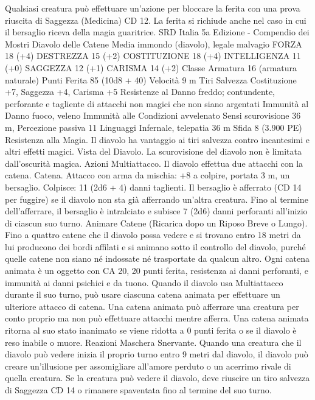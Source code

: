 \begin{multicols}{2}
Qualsiasi creatura può effettuare un’azione per bloccare la ferita
con una prova riuscita di Saggezza (Medicina) CD 12. La ferita
si richiude anche nel caso in cui il bersaglio riceva della magia
guaritrice. 
SRD Italia 5a Edizione - Compendio dei Mostri
Diavolo delle Catene
Media immondo (diavolo), legale malvagio
FORZA 18 (+4)
DESTREZZA 15 (+2)
COSTITUZIONE 18 (+4)
INTELLIGENZA 11 (+0)
SAGGEZZA 12 (+1)
CARISMA 14 (+2)
Classe Armatura 16 (armatura naturale)
Punti Ferita 85 (10d8 + 40)
Velocità 9 m
Tiri Salvezza Costituzione +7, Saggezza +4, Carisma +5
Resistenze al Danno freddo; contundente, perforante e tagliente
di attacchi non magici che non siano argentati
Immunità al Danno fuoco, veleno
Immunità alle Condizioni avvelenato
Sensi scurovisione 36 m, Percezione passiva 11
Linguaggi Infernale, telepatia 36 m
Sfida 8 (3.900 PE)
Resistenza alla Magia. Il diavolo ha vantaggio ai tiri salvezza
contro incantesimi e altri effetti magici.
Vista del Diavolo. La scurovisione del diavolo non è limitata
dall’oscurità magica.
Azioni
Multiattacco. Il diavolo effettua due attacchi con la catena.
Catena. Attacco con arma da mischia: +8 a colpire, portata 3 m,
un bersaglio.
Colpisce: 11 (2d6 + 4) danni taglienti. Il bersaglio è afferrato
(CD 14 per fuggire) se il diavolo non sta già afferrando un’altra
creatura. Fino al termine dell’afferrare, il bersaglio è intralciato e
subisce 7 (2d6) danni perforanti all’inizio di ciascun suo turno.
Animare Catene (Ricarica dopo un Riposo Breve o Lungo).
Fino a quattro catene che il diavolo possa vedere e si trovano
entro 18 metri da lui producono dei bordi affilati e si animano
sotto il controllo del diavolo, purché quelle catene non siano né
indossate né trasportate da qualcun altro.
Ogni catena animata è un oggetto con CA 20, 20 punti ferita,
resistenza ai danni perforanti, e immunità ai danni psichici e da
tuono. Quando il diavolo usa Multiattacco durante il suo turno,
può usare ciascuna catena animata per effettuare un ulteriore
attacco di catena. Una catena animata può afferrare una creatura
per conto proprio ma non può effettuare attacchi mentre afferra.
Una catena animata ritorna al suo stato inanimato se viene ridotta
a 0 punti ferita o se il diavolo è reso inabile o muore.
Reazioni
Maschera Snervante. Quando una creatura che il diavolo può
vedere inizia il proprio turno entro 9 metri dal diavolo, il diavolo
può creare un’illusione per assomigliare all’amore perduto o un
acerrimo rivale di quella creatura. Se la creatura può vedere il
diavolo, deve riuscire un tiro salvezza di Saggezza CD 14 o
rimanere spaventata fino al termine del suo turno.

\end{multicols}
